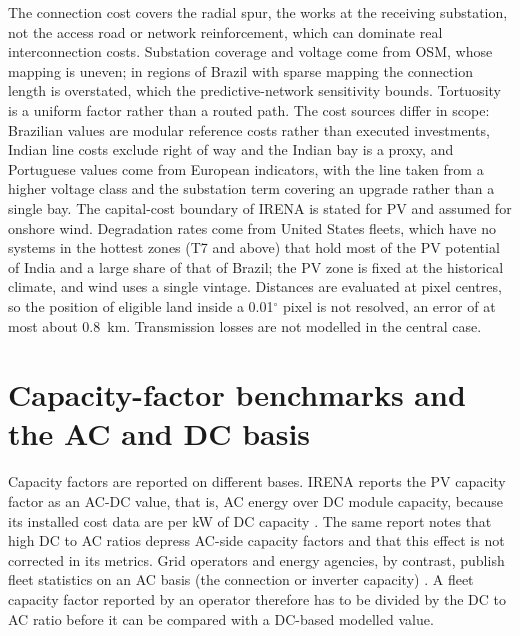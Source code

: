 The connection cost covers the radial spur, the works at the receiving
substation, not the access road or network reinforcement, which can
dominate real interconnection costs. Substation coverage and voltage come
from OSM, whose mapping is uneven; in regions of Brazil with sparse
mapping the connection length is overstated, which the predictive-network
sensitivity bounds. Tortuosity is a uniform factor rather than a routed
path. The cost sources differ in scope: Brazilian values are modular
reference costs rather than executed investments, Indian line costs
exclude right of way and the Indian bay is a proxy, and Portuguese values
come from European indicators, with the line taken from a higher voltage
class and the substation term covering an upgrade rather than a single
bay. The capital-cost
boundary of IRENA is stated for PV and assumed for onshore wind.
Degradation rates come from United States fleets, which have no systems
in the hottest zones (T7 and above) that hold most of the PV potential of
India and a large share of that of Brazil; the PV zone is fixed at the
historical climate, and wind uses a single vintage. Distances are
evaluated at pixel centres, so the position of eligible land inside a
0.01$^\circ$ pixel is not resolved, an error of at most about 0.8~km.
Transmission losses are not modelled in the central case.

\section{Capacity-factor benchmarks and the AC and DC basis}
Capacity factors are reported on different bases. IRENA reports the PV capacity factor as an AC-DC value, that is, AC energy over DC module capacity, because its installed cost data are per kW of DC capacity \citep{irena2025costs24}. The same report notes that high DC to AC ratios depress AC-side capacity factors and that this effect is not corrected in its metrics. Grid operators and energy agencies, by contrast, publish fleet statistics on an AC basis (the connection or inverter capacity) \citep{epe2024nt011,ren2025dados,mnre2026stats}. A fleet capacity factor reported by an operator therefore has to be divided by the DC to AC ratio before it can be compared with a DC-based modelled value.
